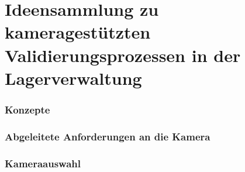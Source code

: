 \chapter{Ideensammlung zu kameragestützten Validierungsprozessen in der Lagerverwaltung}\label{Kap5}

    \subsection {Konzepte}

    \subsection {Abgeleitete Anforderungen an die Kamera}

    \subsection {Kameraauswahl}